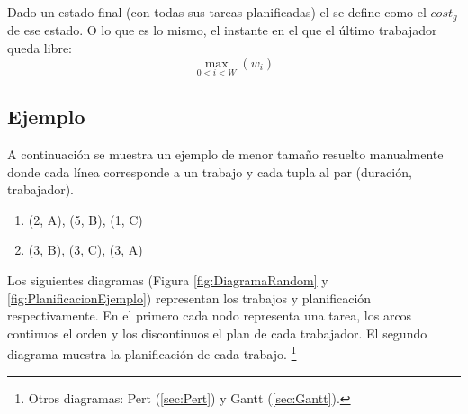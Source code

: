 Dado un estado final (con todas sus tareas planificadas)
el  se define como el $cost_g$ de ese estado.
O lo que es lo mismo, el instante en el que el último
trabajador queda libre:
$$
    \max_{0 < i < W}(w_i)
$$

\pagebreak
\subsection{Ejemplo}
\label{ssec:A*Example}

A continuación se muestra un ejemplo de menor tamaño resuelto manualmente
donde cada línea corresponde a un trabajo y cada tupla al par (duración, trabajador).
\begin{enumerate}[start=0, itemsep=0.25px]
    \item (2, A), (5, B), (1, C)
    \item (3, B), (3, C), (3, A)
\end{enumerate}

Los siguientes diagramas (Figura \ref{fig:DiagramaRandom} y \ref{fig:PlanificacionEjemplo})
representan los trabajos y planificación respectivamente.
En el primero cada nodo representa una tarea,
los arcos continuos el orden
y los discontinuos el plan de cada trabajador.
El segundo diagrama muestra la planificación de cada trabajo.
\footnote{
    Otros diagramas: Pert (\ref{sec:Pert}) y Gantt (\ref{sec:Gantt}).
}

